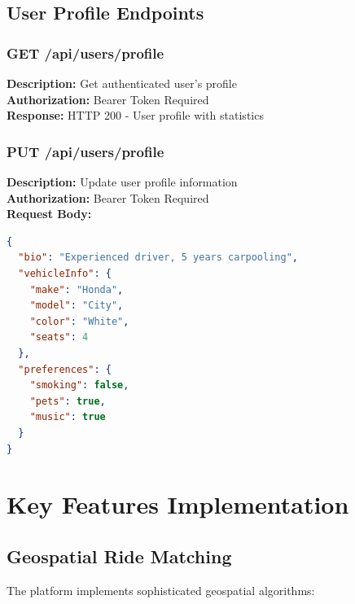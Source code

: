\documentclass[12pt,a4paper]{article}
\begin{document}
\subsection{User Profile Endpoints}

\subsubsection{GET /api/users/profile}
\textbf{Description:} Get authenticated user's profile\\
\textbf{Authorization:} Bearer Token Required\\
\textbf{Response:} HTTP 200 - User profile with statistics

\subsubsection{PUT /api/users/profile}
\textbf{Description:} Update user profile information\\
\textbf{Authorization:} Bearer Token Required\\
\textbf{Request Body:}
\begin{lstlisting}[language=JSON]
{
  "bio": "Experienced driver, 5 years carpooling",
  "vehicleInfo": {
    "make": "Honda",
    "model": "City",
    "color": "White",
    "seats": 4
  },
  "preferences": {
    "smoking": false,
    "pets": true,
    "music": true
  }
}
\end{lstlisting}

\newpage

\section{Key Features Implementation}

\subsection{Geospatial Ride Matching}

The platform implements sophisticated geospatial algorithms:
\end{document}
